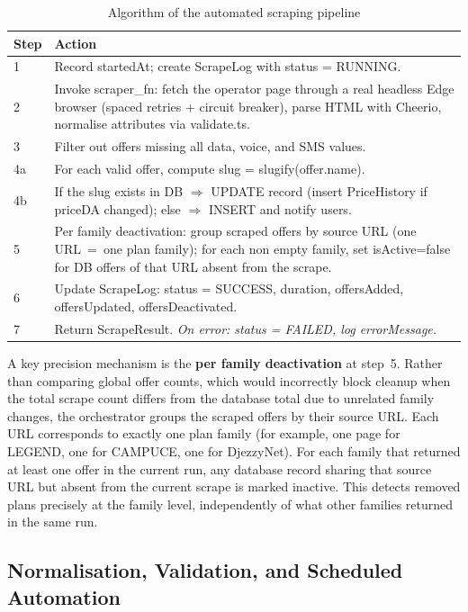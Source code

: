 \begin{table}[H]
  \caption{Algorithm of the automated scraping pipeline}
  \label{tab:scraper-algo}
  \centering\small
  \begin{tabular}{|p{0.8cm}|p{12.5cm}|}
    \hline
    \textbf{Step} & \textbf{Action} \\
    \hline
    1   & Record startedAt; create ScrapeLog with status = RUNNING. \\ \hline
    2   & Invoke scraper\_fn: fetch the operator page through a real headless Edge browser (spaced retries + circuit breaker), parse HTML with Cheerio, normalise attributes via validate.ts. \\ \hline
    3   & Filter out offers missing all data, voice, and SMS values. \\ \hline
    4a  & For each valid offer, compute slug = slugify(offer.name). \\ \hline
    4b  & If the slug exists in DB $\Rightarrow$ UPDATE record (insert PriceHistory if priceDA changed); else $\Rightarrow$ INSERT and notify users. \\ \hline
    5   & Per family deactivation: group scraped offers by source URL (one URL~=~one plan family); for each non empty family, set isActive=false for DB offers of that URL absent from the scrape. \\ \hline
    6   & Update ScrapeLog: status = SUCCESS, duration, offersAdded, offersUpdated, offersDeactivated. \\ \hline
    7   & Return ScrapeResult. \emph{On error: status = FAILED, log errorMessage.} \\ \hline
  \end{tabular}
\end{table}

A key precision mechanism is the \textbf{per family deactivation} at step~5. Rather than comparing global offer counts, which would incorrectly block cleanup when the total scrape count differs from the database total due to unrelated family changes, the orchestrator groups the scraped offers by their source URL. Each URL corresponds to exactly one plan family (for example, one page for LEGEND, one for CAMPUCE, one for DjezzyNet). For each family that returned at least one offer in the current run, any database record sharing that source URL but absent from the current scrape is marked inactive. This detects removed plans precisely at the family level, independently of what other families returned in the same run.

\subsection{Normalisation, Validation, and Scheduled Automation}

